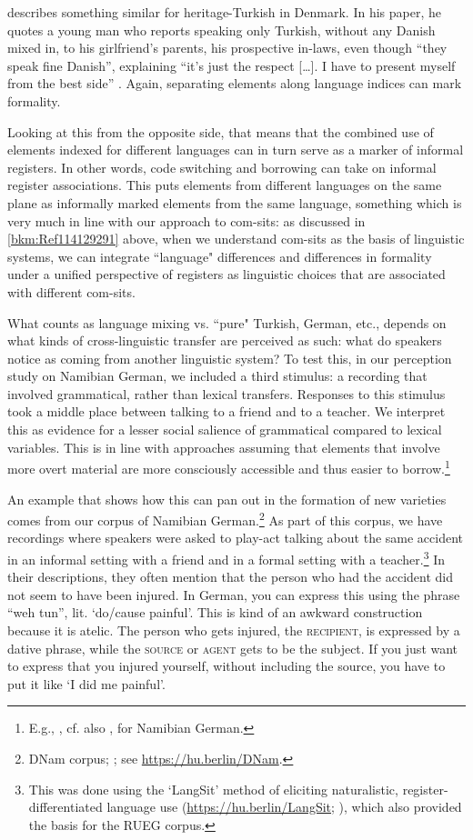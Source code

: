 \citet{Møller2019} describes something similar for heritage-Turkish in Denmark. In his paper, he quotes a young man who reports speaking only Turkish, without any Danish mixed in, to his girlfriend’s parents, his prospective in-laws, even though “they speak fine Danish”, explaining “it’s just the respect […]. I have to present myself from the best side” \citep[45]{Møller2019}. Again, separating elements along language indices can mark formality.

Looking at this from the opposite side, that means that the combined use of elements indexed for different languages can in turn serve as a marker of informal registers. In other words, code switching and borrowing can take on informal register associations. This puts elements from different languages on the same plane as informally marked elements from the same language, something which is very much in line with our approach to com-sits: as discussed in \ref{bkm:Ref114129291} above, when we understand com-sits as the basis of linguistic systems, we can integrate “language" differences and differences in formality under a unified perspective of registers as linguistic choices that are associated with different com-sits.

What counts as language mixing vs. “pure" Turkish, German, etc., depends on what kinds of cross-linguistic transfer are perceived as such: what do speakers notice as coming from another linguistic system? To test this, in our perception study on Namibian German, we included a third stimulus: a recording that involved grammatical, rather than lexical transfers. Responses to this stimulus took a middle place between talking to a friend and to a teacher. We interpret this as evidence for a lesser social salience of grammatical compared to lexical variables. This is in line with approaches assuming that elements that involve more overt material are more consciously accessible and thus easier to borrow.\footnote{E.g., \citet{ThomasonKaufman1988,Labov2001,Matras2020,LevonFox2014}, cf. also \citet{WieseBracke2021}, \citet{SauermannEtal} for Namibian German.}

\largerpage
An example that shows how this can pan out in the formation of new varieties comes from our corpus of Namibian German.\footnote{DNam corpus; \citet{ZimmerEtAl2020}; see \url{https://hu.berlin/DNam}.} As part of this corpus, we have recordings where speakers were asked to play-act talking about the same accident in an informal setting with a friend and in a formal setting with a teacher.\footnote{This was done using the ‘LangSit’ method of eliciting naturalistic, register-differentiated language use (\url{https://hu.berlin/LangSit}; \citealt{Wiese2020b}), which also provided the basis for the RUEG corpus.} In their descriptions, they often mention that the person who had the accident did not seem to have been injured. In German, you can express this using the phrase “weh tun”, lit. ‘do/cause painful’. This is kind of an awkward construction because it is atelic. The person who gets injured, the \textsc{recipient}, is expressed by a dative phrase, while the \textsc{source} or \textsc{agent} gets to be the subject. If you just want to express that you injured yourself, without including the source, you have to put it like ‘I did me painful’.

